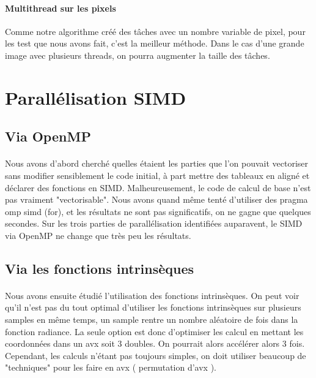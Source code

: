 \documentclass{article}
\begin{document}
\paragraph{Multithread sur les pixels}
Comme notre algorithme cr\'e\'e des t\^aches avec un nombre variable de pixel, pour les test que nous avons fait, c'est la meilleur m\'ethode. 
Dans le cas d'une grande image avec plusieurs threads, on pourra augmenter la taille des t\^aches.

\newpage

\section{Parall\'elisation SIMD}

\subsection{Via OpenMP}
\paragraph{}
Nous avons d'abord cherch\'e quelles \'etaient les parties que l'on pouvait vectoriser sans modifier sensiblement le code initial, \`a part mettre des tableaux en align\'e et d\'eclarer des fonctions en SIMD. Malheureusement, le code de calcul de base n'est pas vraiment "vectorisable". Nous avons quand m\^eme tent\'e d'utiliser des pragma omp simd (for), et les r\'esultats ne sont pas significatifs, on ne gagne que quelques secondes. Sur les trois parties de parallélisation identifi\'ees auparavent, le SIMD via OpenMP ne change que tr\`es peu les r\'esultats.

\subsection{Via les fonctions intrins\`eques}
\paragraph{}
Nous avons ensuite \'etudi\'e l'utilisation des fonctions intrins\`eques. 
On peut voir qu'il n'est pas du tout optimal d'utiliser les fonctions intrins\`eques sur plusieurs samples en m\^eme temps, un sample rentre un nombre al\'eatoire de fois dans la fonction radiance. 
La seule option est donc d'optimiser les calcul en mettant les coordonn\'ees dans un avx soit 3 doubles. On pourrait alors acc\'el\'erer alors 3 fois. Cependant, les calculs n'\'etant pas toujours simples,
on doit utiliser beaucoup de "techniques" pour les faire en avx ( permutation d'avx ).
\end{document}
